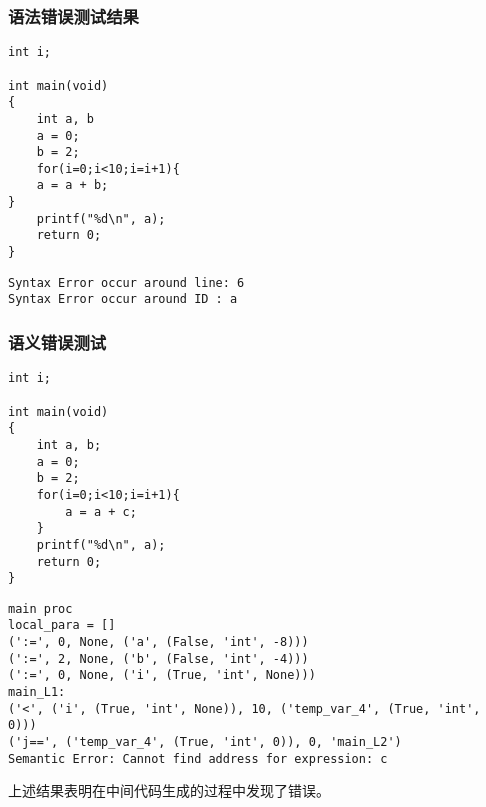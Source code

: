 \documentclass{article}
\begin{document}
\subsubsection{语法错误测试结果}

\begin{verbatim}
int i;

int main(void)
{
    int a, b
    a = 0;
    b = 2;
    for(i=0;i<10;i=i+1){
    a = a + b;
}
    printf("%d\n", a);
    return 0;
}
\end{verbatim}

\begin{verbatim}
Syntax Error occur around line: 6
Syntax Error occur around ID : a
\end{verbatim}

\subsubsection{语义错误测试}

\begin{verbatim}
int i;

int main(void)
{
    int a, b;
    a = 0;
    b = 2;
    for(i=0;i<10;i=i+1){
        a = a + c;
    }
    printf("%d\n", a);
    return 0;
}
\end{verbatim}

\begin{verbatim}
main proc
local_para = []
(':=', 0, None, ('a', (False, 'int', -8)))
(':=', 2, None, ('b', (False, 'int', -4)))
(':=', 0, None, ('i', (True, 'int', None)))
main_L1:
('<', ('i', (True, 'int', None)), 10, ('temp_var_4', (True, 'int', 0)))
('j==', ('temp_var_4', (True, 'int', 0)), 0, 'main_L2')
Semantic Error: Cannot find address for expression: c
\end{verbatim}

上述结果表明在中间代码生成的过程中发现了错误。
\end{document}
